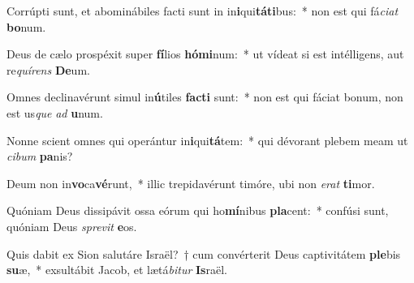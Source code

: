 \item Corrúpti sunt, et abominábiles facti sunt in in\textbf{i}qui\textbf{tá}\textbf{ti}bus:~* non est qui fá\textit{ci}\textit{at} \textbf{bo}num.
\item Deus de cælo prospéxit super \textbf{fí}lios \textbf{hó}\textbf{mi}num:~* ut vídeat si est intélligens, aut re\textit{quí}\textit{rens} \textbf{De}um.
\item Omnes declinavérunt simul in\textbf{ú}tiles \textbf{fac}\textbf{ti} sunt:~* non est qui fáciat bonum, non est us\textit{que} \textit{ad} \textbf{u}num.
\item Nonne scient omnes qui operántur in\textbf{i}qui\textbf{tá}tem:~* qui dévorant plebem meam ut \textit{ci}\textit{bum} \textbf{pa}nis?
\item Deum non in\textbf{vo}ca\textbf{vé}runt,~* illic trepidavérunt timóre, ubi non \textit{e}\textit{rat} \textbf{ti}mor.
\item Quóniam Deus dissipávit ossa eórum qui ho\textbf{mí}nibus \textbf{pla}cent:~* confúsi sunt, quóniam Deus \textit{spre}\textit{vit} \textbf{e}os.
\item Quis dabit ex Sion salutáre Israël?~† cum convérterit Deus captivitátem \textbf{ple}bis \textbf{su}æ,~* exsultábit Jacob, et lætá\textit{bi}\textit{tur} \textbf{Is}raël.
